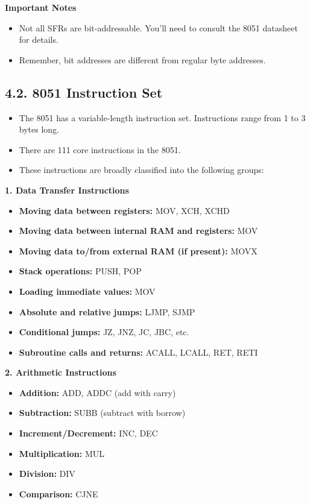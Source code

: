 \documentclass[
]{article}
\begin{document}
\textbf{Important Notes}

\begin{itemize}
\item
  Not all SFRs are bit-addressable. You'll need to consult the 8051
  datasheet for details.
\item
  Remember, bit addresses are different from regular byte addresses.
\end{itemize}

\hypertarget{42-8051-instruction-set}{%
\subsection{4.2. 8051 Instruction Set}\label{42-8051-instruction-set}}

\begin{itemize}
\item
  The 8051 has a variable-length instruction set. Instructions range
  from 1 to 3 bytes long.
\item
  There are 111 core instructions in the 8051.
\item
  These instructions are broadly classified into the following groups:
\end{itemize}

\textbf{1. Data Transfer Instructions}

\begin{itemize}
\item
  \textbf{Moving data between registers:} MOV, XCH, XCHD
\item
  \textbf{Moving data between internal RAM and registers:} MOV
\item
  \textbf{Moving data to/from external RAM (if present):} MOVX
\item
  \textbf{Stack operations:} PUSH, POP
\item
  \textbf{Loading immediate values:} MOV
\item
  \textbf{Absolute and relative jumps:} LJMP, SJMP
\item
  \textbf{Conditional jumps:} JZ, JNZ, JC, JBC, etc.
\item
  \textbf{Subroutine calls and returns:} ACALL, LCALL, RET, RETI
\end{itemize}

\textbf{2. Arithmetic Instructions}

\begin{itemize}
\item
  \textbf{Addition:} ADD, ADDC (add with carry)
\item
  \textbf{Subtraction:} SUBB (subtract with borrow)
\item
  \textbf{Increment/Decrement:} INC, DEC
\item
  \textbf{Multiplication:} MUL
\item
  \textbf{Division:} DIV
\item
  \textbf{Comparison:} CJNE
\end{itemize}
\end{document}
